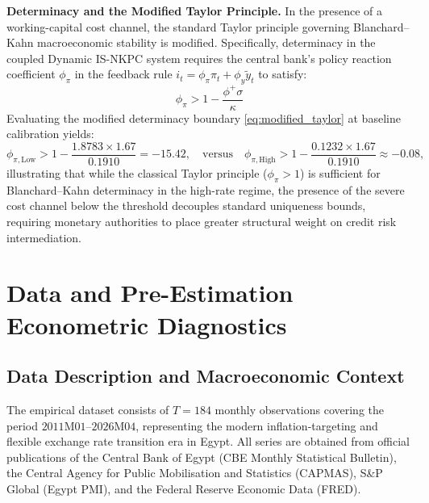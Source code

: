 \documentclass[review,12pt]{elsarticle}
\begin{document}
\textbf{Determinacy and the Modified Taylor Principle.} In the presence of a working-capital cost channel, the standard Taylor principle governing Blanchard--Kahn macroeconomic stability is modified. Specifically, determinacy in the coupled Dynamic IS-NKPC system requires the central bank's policy reaction coefficient $\phi_\pi$ in the feedback rule $i_t = \phi_\pi \pi_t + \phi_y \tilde{y}_t$ to satisfy:
\begin{equation}
\phi_\pi > 1 - \frac{\phi^{+} \sigma}{\kappa}
\label{eq:modified_taylor}
\end{equation}
Evaluating the modified determinacy boundary \eqref{eq:modified_taylor} at baseline calibration yields:
\begin{equation}
\phi_{\pi, \text{Low}} > 1 - \frac{1.8783 \times 1.67}{0.1910} = \mathbf{-15.42}, \quad \text{versus} \quad \phi_{\pi, \text{High}} > 1 - \frac{0.1232 \times 1.67}{0.1910} \approx \mathbf{-0.08},
\label{eq:numerical_determinacy}
\end{equation}
illustrating that while the classical Taylor principle ($\phi_\pi > 1$) is sufficient for Blanchard--Kahn determinacy in the high-rate regime, the presence of the severe cost channel below the threshold decouples standard uniqueness bounds, requiring monetary authorities to place greater structural weight on credit risk intermediation.

\section{Data and Pre-Estimation Econometric Diagnostics}
\label{sec:data}

\subsection{Data Description and Macroeconomic Context}
\label{sec:data_desc}

The empirical dataset consists of $T=184$ monthly observations covering the period
$2011\text{M}01$--$2026\text{M}04$, representing the modern inflation-targeting and
flexible exchange rate transition era in Egypt. All series are obtained from official
publications of the Central Bank of Egypt (CBE Monthly Statistical Bulletin), the
Central Agency for Public Mobilisation and Statistics (CAPMAS), S\&P Global (Egypt PMI),
and the Federal Reserve Economic Data (FRED).
\end{document}
